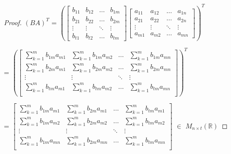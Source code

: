     \begin{proof}
        $(BA)^T$ =
        $(\begin{bmatrix}
            b_{11} & b_{12} & \hdots & b_{1m} \\
            b_{21} & b_{22} & \hdots & b_{2m} \\
            \vdots & \vdots & \ddots & \vdots \\
            b_{t1} & b_{t2} & \hdots & b_{tm}
        \end{bmatrix}
        \begin{bmatrix}
            a_{11} & a_{12} & \hdots & a_{1n} \\
            a_{21} & a_{22} & \hdots & a_{2n} \\
            \vdots & \vdots & \ddots & \vdots \\
            a_{m1} & a_{m2} & \hdots & a_{mn}
        \end{bmatrix})^T$
        
        \hspace{1.15cm}
        =
        $(\begin{bmatrix}
            \sum_{k=1}^m b_{1m}a_{m1}
                & \sum_{k=1}^m b_{1m}a_{m2}
                & \hdots
                & \sum_{k=1}^m b_{1m}a_{mn} \\
            \sum_{k=1}^m b_{2m}a_{m1}
                & \sum_{k=1}^m b_{2m}a_{m2}
                & \hdots
                & \sum_{k=1}^m b_{2m}a_{mn} \\
            \vdots & \vdots & \ddots & \vdots \\
            \sum_{k=1}^m b_{tm}a_{m1}
                & \sum_{k=1}^m b_{tm}a_{m2}
                & \hdots
                & \sum_{k=1}^m b_{tm}a_{mn} \\
        \end{bmatrix})^T$
        
        \hspace{1.15cm}
        =
        $\begin{bmatrix}
            \sum_{k=1}^m b_{1m}a_{m1}
                & \sum_{k=1}^m b_{2m}a_{m1}
                & \hdots
                & \sum_{k=1}^m b_{tm}a_{m1} \\
            \sum_{k=1}^m b_{1m}a_{m2}
                & \sum_{k=1}^m b_{2m}a_{m2}
                & \hdots
                & \sum_{k=1}^m b_{tm}a_{m2} \\
            \vdots & \vdots & \ddots & \vdots \\
            \sum_{k=1}^m b_{1m}a_{mn}
                & \sum_{k=1}^m b_{2m}a_{mn}
                & \hdots
                & \sum_{k=1}^m b_{tm}a_{mn} \\
        \end{bmatrix}$
        $\in$ $M_{n \times t}(\mathbb{R})$ 


\end{proof}

